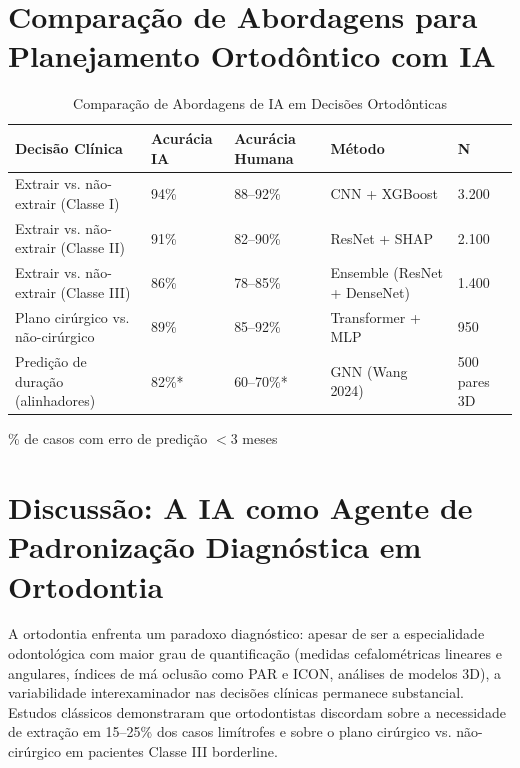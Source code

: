 
\section{Comparação de Abordagens para Planejamento Ortodôntico com IA}

\begin{table}[H]
\centering
\caption{Comparação de Abordagens de IA em Decisões Ortodônticas}
\label{tab:orto-decision-comparison}
\begin{tabular}{p{2.8cm}p{2cm}p{2.2cm}p{2.5cm}p{2.2cm}}
\toprule
\textbf{Decisão Clínica} & \textbf{Acurácia IA} & \textbf{Acurácia Humana} & \textbf{Método} & \textbf{N} \\
\midrule
Extrair vs. não-extrair (Classe I) & 94\% & 88--92\% & CNN + XGBoost & 3.200 \\
Extrair vs. não-extrair (Classe II) & 91\% & 82--90\% & ResNet + SHAP & 2.100 \\
Extrair vs. não-extrair (Classe III) & 86\% & 78--85\% & Ensemble (ResNet + DenseNet) & 1.400 \\
Plano cirúrgico vs. não-cirúrgico & 89\% & 85--92\% & Transformer + MLP & 950 \\
Predição de duração (alinhadores) & 82\%* & 60--70\%* & GNN (Wang 2024) & 500 pares 3D \\
\bottomrule
\end{tabular}
\par\small *\% de casos com erro de predição $<3$ meses
\end{table}

\section{Discussão: A IA como Agente de Padronização Diagnóstica em Ortodontia}

A ortodontia enfrenta um paradoxo diagnóstico: apesar de ser a especialidade odontológica com maior grau de quantificação (medidas cefalométricas lineares e angulares, índices de má oclusão como PAR e ICON, análises de modelos 3D), a variabilidade interexaminador nas decisões clínicas permanece substancial. Estudos clássicos demonstraram que ortodontistas discordam sobre a necessidade de extração em 15--25\% dos casos limítrofes e sobre o plano cirúrgico vs. não-cirúrgico em pacientes Classe III borderline.

